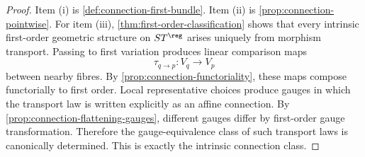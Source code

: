 \begin{proof}
	Item \textup{(i)} is \cref{def:connection-first-bundle}.  Item
	\textup{(ii)} is \cref{prop:connection-pointwise}.
	For item \textup{(iii)}, \cref{thm:first-order-classification} shows
	that every intrinsic first-order geometric structure on \(ST^{\reg}\)
	arises uniquely from morphism transport.  Passing to first variation
	produces linear comparison maps
	\[
		\tau_{q\to p}:V_q\to V_p
	\]
	between nearby fibres.  By \cref{prop:connection-functoriality}, these
	maps compose functorially to first order.
	Local representative choices produce gauges in which the transport law
	is written explicitly as an affine connection.  By
	\cref{prop:connection-flattening-gauges}, different gauges differ by
	first-order gauge transformation.  Therefore the gauge-equivalence class
	of such transport laws is canonically determined.
	This is exactly the intrinsic connection class.
\end{proof}
